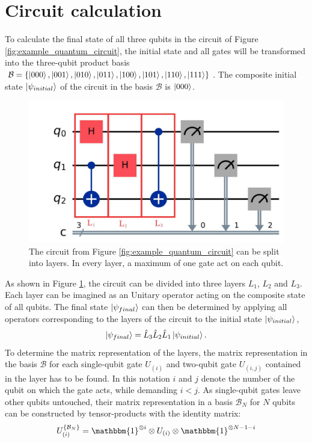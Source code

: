 \section{Circuit calculation} \label{sec:circuit_calculation}
	To calculate the final state of all three qubits in the circuit of Figure \ref{fig:example_quantum_circuit}, the initial state and all gates will be transformed into the three-qubit product basis $\mathcal{B}=\left\{\ket{000},\ket{001},\ket{010},\ket{011},\ket{100},\ket{101},\ket{110},\ket{111}\right\}$. The composite initial state $\ket{\psi_{initial}}$ of the circuit in the basis $\mathcal{B}$ is $\ket{000}$.
	\begin{figure}[H]
		\centering
		\includegraphics[width=0.5\linewidth]{figures/example_quantum_circuit_with_layers.pdf}
		\caption{The circuit from Figure \ref{fig:example_quantum_circuit} can be split into layers. In every layer, a maximum of one gate act on each qubit.}
		\label{fig:example_quantum_circuit_with_layers}
	\end{figure}
	As shown in Figure \ref{fig:example_quantum_circuit_with_layers}, the circuit can be divided into three layers $L_1$, $L_2$ and $L_3$. Each layer can be imagined as an Unitary operator acting on the composite state of all qubits. The final state $\ket{\psi_{final}}$ can then be determined by applying all operators corresponding to the layers of the circuit to the initial state $\ket{\psi_{initial}}$,
	\begin{equation}
		\label{eq:apply_layers_to_initial_state}
		\ket{\psi_{final}}=\hat{L}_3\hat{L}_2\hat{L}_1\ket{\psi_{initial}}.
	\end{equation}
	To determine the matrix representation of the layers, the matrix representation in the basis $\mathcal{B}$ for each single-qubit gate $U_{(i)}$ and two-qubit gate $U_{(i, j)}$ contained in the layer has to be found. In this notation $i$ and $j$ denote the number of the qubit on which the gate acts, while demanding $i < j$.
	As single-qubit gates leave other qubits untouched, their matrix representation in a basis $\mathcal{B}_N$ for $N$ qubits can be constructed by tensor-products with the identity matrix:
	\begin{equation}
		\label{eq:single_qubit_gate_product_basis}
		U^{\{\mathcal{B}_N\}}_{(i)}=\mathbbm{1}^{\otimes i}\otimes U_{(i)}\otimes \mathbbm{1}^{\otimes N-1-i}
	\end{equation}
